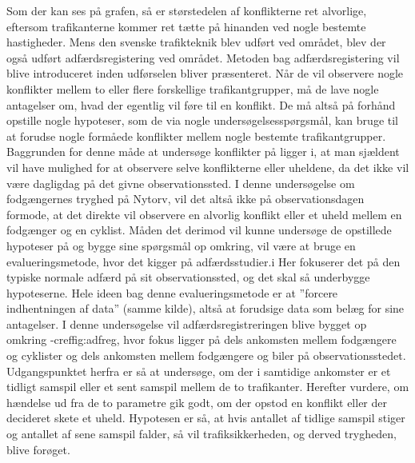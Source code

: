 Som der kan ses på grafen, så er størstedelen af konflikterne ret alvorlige, eftersom trafikanterne kommer ret tætte på hinanden ved nogle bestemte hastigheder.
Mens den svenske trafikteknik blev udført ved området, blev der også udført adfærdsregistering ved området. Metoden bag adfærdsregistering vil blive introduceret inden udførselen bliver præsenteret.
Når	de vil	observere nogle	konflikter mellem to eller flere	forskellige trafikantgrupper,	må de lave	nogle antagelser	om, hvad	 der egentlig vil føre til en konflikt. De må altså	på	forhånd	opstille nogle hypoteser, som de via nogle undersøgelsesspørgsmål, kan bruge til	at forudse nogle	formåede	konflikter mellem nogle bestemte	trafikantgrupper.	Baggrunden for denne	måde at	undersøge konflikter	på ligger i,	at man sjældent 	vil	have	mulighed	 for at	observere selve konflikterne	eller uheldene, da det ikke	vil	være	 dagligdag på	 det	 givne observationssted.	I denne	undersøgelse om	fodgængernes tryghed på	Nytorv,	vil det altså ikke på observationsdagen formode,	at det direkte vil observere en alvorlig	 konflikt eller	et uheld mellem	en fodgænger og	en cyklist.	Måden det derimod	vil	kunne undersøge	de opstillede hypoteser på og bygge sine	spørgsmål op omkring, vil	være	at bruge en	evalueringsmetode, hvor	det	kigger på adfærdsstudier.i Her fokuserer	det	på den typiske normale adfærd på	sit observationssted, og	det skal så	underbygge	hypoteserne. Hele ideen bag denne evalueringsmetode er at ”forcere indhentningen af data”	(samme	kilde),	altså at forudsige data	som	belæg for sine antagelser.
I denne undersøgelse vil	adfærdsregistreringen blive bygget op omkring	 -cref{fig:adfreg},	hvor fokus ligger på dels ankomsten mellem fodgængere	 og cyklister og dels ankomsten mellem	fodgængere og biler på observationsstedet. Udgangspunktet herfra er så at	undersøge, om	der i samtidige ankomster er	et tidligt samspil eller	et sent samspil mellem de to trafikanter.
Herefter vurdere, om hændelse ud fra	de to parametre gik godt, om	der	opstod en konflikt	eller der decideret skete et	uheld. Hypotesen er	så,	at hvis	antallet af	tidlige samspil stiger og antallet af sene samspil falder, så vil trafiksikkerheden, og derved trygheden, blive forøget.
